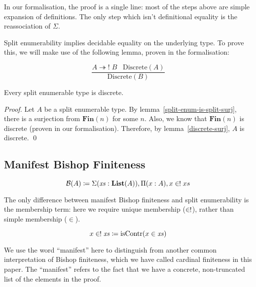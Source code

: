 In our formalisation, the proof is a single line: most of the steps above are
simple expansion of definitions.
The only step which isn't definitional equality is the reassociation of
\(\Sigma\).

Split enumerability implies decidable equality on the underlying type.
To prove this, we will make use of the following lemma, proven in the
formalisation:
\begin{lemma} \label{discrete-surj}
  \begin{equation}
    \frac{
        A \twoheadrightarrow! \; B \; \; \; \text{Discrete}(A)
      }{
       \text{Discrete}(B) 
      }
  \end{equation}
\end{lemma}
\begin{lemma} \label{split-enum-discrete}
  Every split enumerable type is discrete.
\end{lemma}
\begin{proof}
  Let \(A\) be a split enumerable type.
  By lemma~\ref{split-enum-is-split-surj}, there is a surjection from
  \(\mathbf{Fin}(n)\) for some \(n\).
  Also, we know that \(\mathbf{Fin}(n)\) is discrete (proven in our
  formalisation).
  Therefore, by lemma~\ref{discrete-surj}, \(A\) is discrete.
  \qed
\end{proof}
\subsection{Manifest Bishop Finiteness}
\begin{definition}
  \begin{equation} \label{bish-def}
    \mathcal{B}(A) \coloneqq \Sigma {(\mathit{xs} : \textbf{List}(A))} , \Pi {(x : A)} , x \inunique xs
  \end{equation}
\end{definition}
The only difference between manifest Bishop finiteness and split enumerability
is the membership term: here we require unique membership (\(\inunique\)),
rather than simple membership (\(\in\)).
\begin{definition} \label{uniq-memb-def}
  \begin{equation}
    x \inunique \mathit{xs} \coloneqq \text{isContr}(x \in \mathit{xs})
  \end{equation}
\end{definition}

We use the word ``manifest'' here to distinguish from another common
interpretation of Bishop finiteness, which we have called cardinal finiteness in
this paper.
The ``manifest'' refers to the fact that we have a concrete, non-truncated list
of the elements in the proof.

